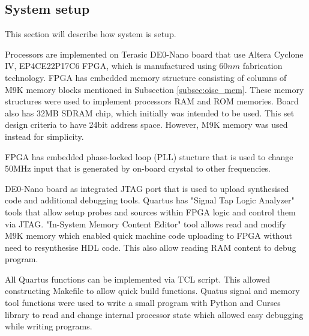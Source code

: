 \subsection{System setup}\label{subsec:setup}
This section will describe how system is setup.

Processors are implemented on Terasic DE0-Nano board that use Altera Cyclone IV, EP4CE22P17C6 FPGA, which is manufactured using $60nm$ fabrication technology.
FPGA has embedded memory structure consisting of columns of M9K memory blocks mentioned in Subsection \ref{subsec:oisc_mem}. These memory structures were used to implement processors RAM and ROM memories. Board also has 32MB SDRAM chip, which initially was intended to be used. This set design criteria to have 24bit address space. However, M9K memory was used instead for simplicity. 

FPGA has embedded phase-locked loop (PLL) stucture that is used to change 50MHz input that is generated by on-board crystal to other frequencies. 

DE0-Nano board as integrated JTAG port that is used to upload synthesised code and additional debugging tools. Quartus has "Signal Tap Logic Analyzer" tools that allow setup probes and sources within FPGA logic and control them via JTAG. "In-System Memory Content Editor" tool allows read and modify M9K memory which enabled quick machine code uploading to FPGA without need to resynthesise HDL code. This also allow reading RAM content to debug program. 

All Quartus functions can be implemented via TCL script. This allowed constructing Makefile to allow quick build functions. Quatus signal and memory tool functions were used to write a small program with Python and Curses library to read and change internal processor state which allowed easy debugging while writing programs. 


